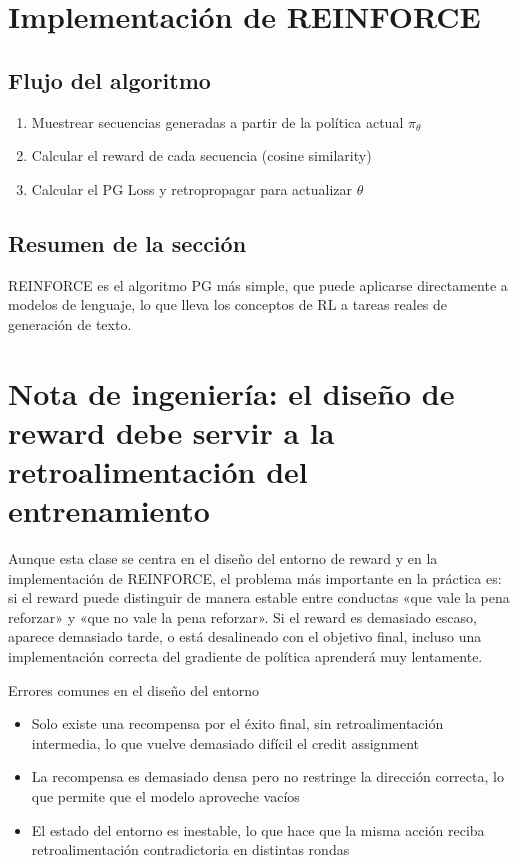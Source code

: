 \documentclass[a4paper]{article}
\begin{document}
\section{Implementación de REINFORCE}
\subsection{Flujo del algoritmo}
\begin{enumerate}
  \item Muestrear secuencias generadas a partir de la política actual $\pi_\theta$
  \item Calcular el reward de cada secuencia (cosine similarity)
  \item Calcular el PG Loss y retropropagar para actualizar $\theta$
\end{enumerate}

\subsection{Resumen de la sección}
REINFORCE es el algoritmo PG más simple, que puede aplicarse directamente a modelos de lenguaje, lo que lleva los conceptos de RL a tareas reales de generación de texto.

\section{Nota de ingeniería: el diseño de reward debe servir a la retroalimentación del entrenamiento}
Aunque esta clase se centra en el diseño del entorno de reward y en la implementación de REINFORCE, el problema más importante en la práctica es: si el reward puede distinguir de manera estable entre conductas «que vale la pena reforzar» y «que no vale la pena reforzar». Si el reward es demasiado escaso, aparece demasiado tarde, o está desalineado con el objetivo final, incluso una implementación correcta del gradiente de política aprenderá muy lentamente.

\begin{warningbox}{Errores comunes en el diseño del entorno}
\begin{itemize}
  \item Solo existe una recompensa por el éxito final, sin retroalimentación intermedia, lo que vuelve demasiado difícil el credit assignment
  \item La recompensa es demasiado densa pero no restringe la dirección correcta, lo que permite que el modelo aproveche vacíos
  \item El estado del entorno es inestable, lo que hace que la misma acción reciba retroalimentación contradictoria en distintas rondas
\end{itemize}
\end{warningbox}
\end{document}
